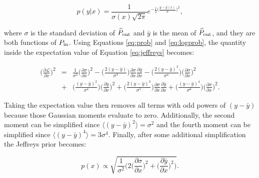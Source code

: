 \documentclass[preprint2,numberedappendix,tighten]{aastex6}  %
\begin{document}
\begin{equation}
\label{eq:prob}
p(y | x) = \frac{1}{\sigma(x) \sqrt{2\pi}} e^{-\frac{1}{2}\big(\frac{y-\bar y(x)}{\sigma}\big)^{2}},
\end{equation}

\noindent where $\sigma$ is the standard deviation of $\widehat{P}_{\rm out}$ and $\bar y$ is the mean of $\widehat{P}_{\rm out}$, and they are both functions of $P_{\rm in}$. Using Equations \eqref{eq:prob} and \eqref{eq:logprob}, the quantity inside the expectation value of Equation \eqref{eq:jeffreys} becomes:



\begin{eqnarray}
\Big(\frac{\partial \mathcal{L}}{\partial x} \Big)^{2} &=& \frac{1}{\sigma^{2}}\Big(\frac{\partial \sigma}{\partial x}\Big)^{2} -  \Big(\frac{2(y-\bar y)}{\sigma^{3}}\Big)\frac{\partial \sigma}{\partial x}\frac{\partial \bar y}{\partial x} - \Big(\frac{2(y-\bar y)^{2}}{\sigma^{4}}\Big)\Big(\frac{\partial \sigma}{\partial x}\Big)^{2} \nonumber \\
&+& \Big(\frac{(y-\bar y)^{2}}{\sigma^{4}}\Big)\Big(\frac{\partial \bar y}{\partial x}\Big)^{2} + \Big(\frac{2(y-\bar y)^{3}}{\sigma^{5}}\Big)\frac{\partial \sigma}{\partial x}\frac{\partial \bar y}{\partial x} + \Big(\frac{(y-\bar y)^{4}}{\sigma^{6}}\Big)\Big(\frac{\partial \sigma}{\partial x}\Big)^{2}.
\end{eqnarray}

Taking the expectation value then removes all terms with odd powers of $(y - \bar y)$ because those Gaussian moments evaluate to zero. Additionally, the second moment can be simplified since $\langle (y - \bar y)^{2} \rangle = \sigma^{2}$ and the fourth moment can be simplified since $\langle (y - \bar y)^{4} \rangle = 3\sigma^{4}$. Finally, after some additional simplification the Jeffreys prior becomes:

\begin{equation}
\label{eq:jeffreys_final}
p(x) \propto \sqrt{ \frac{1}{\sigma^{2}}\Big(2\Big(\frac{\partial \sigma}{\partial x}\Big)^{2} + \Big(\frac{\partial \bar y}{\partial x}\Big)^{2}\Big) }.
\end{equation}
\end{document}
